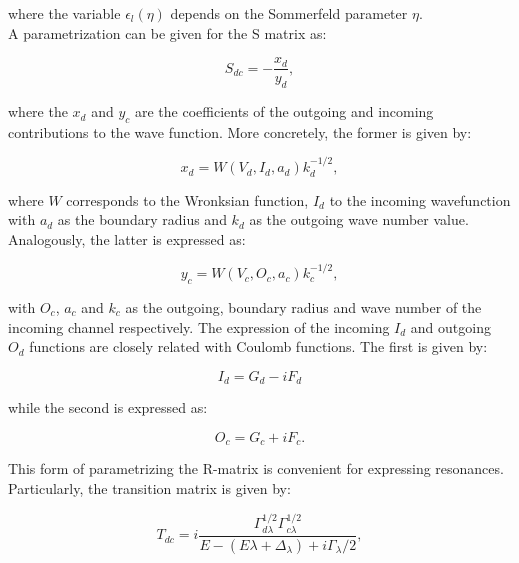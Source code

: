 \documentclass[openany]{book}
\begin{document}
where the variable $\epsilon_l(\eta)$ depends on the Sommerfeld parameter $\eta$. \\

A parametrization can be given for the S matrix as:

\begin{equation}\label{eq:rmatrix_kmatrix_Smatrix_definition}
	S_{dc} = - \frac{x_d}{y_d},
\end{equation}

where the $x_d$ and $y_c$ are the coefficients of the outgoing and incoming contributions to the wave function. More concretely, the former is given by:

\begin{equation}\label{eq:rmatrix_kmatrix_Smatrix_x}
	x_d = W(V_d, I_d, a_d) k^{-1/2}_d,
\end{equation}

where $W$ corresponds to the Wronksian function, $I_d$ to the incoming wavefunction  with $a_d$ as the boundary radius and $k_d$ as the outgoing wave number value. Analogously, the latter is expressed as: 

\begin{equation}\label{eq:rmatrix_kmatrix_Smatrix_y}
	y_c = W(V_c, O_c, a_c) k^{-1/2}_c,
\end{equation}

with $O_c$, $a_c$ and $k_c$ as the outgoing, boundary radius and wave number of the incoming channel respectively. The expression of the incoming $I_d$ and outgoing $O_d$ functions are closely related with Coulomb functions. The first is given by:

\begin{equation}\label{eq:rmatrix_kmatrix_Smatrix_ingoing}
	I_d = G_d - i F_d
\end{equation}

while the second is expressed as:

\begin{equation}\label{eq:rmatrix_kmatrix_Smatrix_outgoing}
	O_c = G_c + iF_c.
\end{equation}


This form of parametrizing the R-matrix is convenient for expressing resonances. Particularly, the transition matrix is given by:

\begin{equation}\label{eq:rmatrix_kmatrix_transitionMatrix}
	T_{dc} = i \frac{\Gamma^{1/2}_{d\lambda} \Gamma^{1/2}_{c\lambda} }{E - (E\lambda + \Delta_\lambda) + i \Gamma_\lambda/2},
\end{equation}
\end{document}

